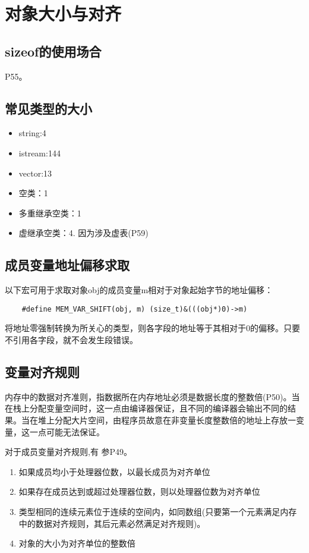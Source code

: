 \section{对象大小与对齐}

\subsection{sizeof的使用场合}
\cite{pibible}P55。

\subsection{常见类型的大小}
\begin{itemize}
    \item string:4
    \item istream:144
    \item vector:13
    \item 空类：1
    \item 多重继承空类：1
    \item 虚继承空类：4. 因为涉及虚表(\cite{pibible}P59)
\end{itemize}

\subsection{成员变量地址偏移求取}
以下宏可用于求取对象obj的成员变量m相对于对象起始字节的地址偏移\cite{pibible}：
\begin{lstlisting}
    #define MEM_VAR_SHIFT(obj, m) (size_t)&(((obj*)0)->m)
\end{lstlisting}
将地址零强制转换为所关心的类型，则各字段的地址等于其相对于0的偏移。只要不引用各字段，就不会发生段错误。

\subsection{变量对齐规则}
内存中的数据对齐准则，指数据所在内存地址必须是数据长度的整数倍(\cite{pibible}P50)。当在栈上分配变量空间时，这一点由编译器保证，且不同的编译器会输出不同的结果。当在堆上分配大片空间，由程序员故意在非变量长度整数倍的地址上存放一变量，这一点可能无法保证。

对于成员变量对齐规则,有
参\cite{pibible}P49。
\begin{enumerate}
    \item 如果成员均小于处理器位数，以最长成员为对齐单位
    \item 如果存在成员达到或超过处理器位数，则以处理器位数为对齐单位
    \item 类型相同的连续元素位于连续的空间内，如同数组(只要第一个元素满足内存中的数据对齐规则，其后元素必然满足对齐规则)。
    \item 对象的大小为对齐单位的整数倍
\end{enumerate}

